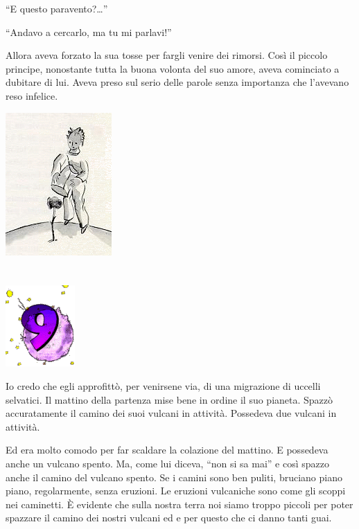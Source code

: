 \documentclass[11pt]{scrbook}
\begin{document}
``E questo paravento?\ldots{}''

``Andavo a cercarlo, ma tu mi parlavi!''

Allora aveva forzato la sua tosse per fargli venire dei rimorsi. Così il piccolo principe, nonostante tutta la buona volonta del suo amore, aveva cominciato a dubitare di lui. Aveva preso sul serio delle parole senza importanza che l'avevano reso infelice.

\begin{center}
\includegraphics{img/princKvetina}
\end{center}

\chapter{}
\begin{center}
\includegraphics{img/chapter9}
\end{center}

Io credo che egli approfittò, per venirsene via, di una migrazione di uccelli selvatici. Il mattino della partenza mise bene in ordine il suo pianeta. Spazzò accuratamente il camino dei suoi vulcani in attività. Possedeva due vulcani in attività.

Ed era molto comodo per far scaldare la colazione del mattino. E
possedeva anche un vulcano spento. Ma, come lui diceva, ``non si sa
mai'' e così spazzo anche il camino del vulcano spento. Se i camini sono
ben puliti, bruciano piano piano, regolarmente, senza eruzioni. Le
eruzioni vulcaniche sono come gli scoppi nei caminetti. È evidente che
sulla nostra terra noi siamo troppo piccoli per poter spazzare il camino
dei nostri vulcani ed e per questo che ci danno tanti guai.
\end{document}
